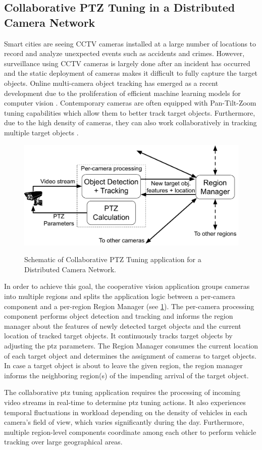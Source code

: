 \subsection{Collaborative PTZ Tuning in a Distributed Camera Network}
Smart cities are seeing CCTV cameras installed at a large number of locations to record and analyze unexpected events such as accidents and crimes. However, surveillance using CCTV cameras is largely done after an incident has occurred and the static deployment of cameras makes it difficult to fully capture the target objects. Online multi-camera object tracking has emerged as a recent development due to the proliferation of efficient machine learning models for computer vision \cite{coralpie}. Contemporary cameras are often equipped with Pan-Tilt-Zoom tuning capabilities which allow them to better track target objects. Furthermore, due to the high density of cameras, they can also work collaboratively in tracking multiple target objects \cite{matsuyama2002real}.
\begin{figure}[h]
\centering
\includegraphics[width=0.75\columnwidth]{figures/apps/multi_cam_ptz}
\label{fig:multi_cam_ptz_app}
\caption{Schematic of Collaborative PTZ Tuning application for a Distributed Camera Network.}
\end{figure}
\par In order to achieve this goal, the cooperative vision application groups cameras into multiple regions and splits the application logic between a per-camera component and a per-region Region Manager (see \cref{fig:multi_cam_ptz_app}). The per-camera processing component performs object detection and tracking and informs the region manager about the features of newly detected target objects and the current location of tracked target objects. It continuously tracks target objects by adjusting the \gls{ptz} parameters. The Region Manager consumes the current location of each target object and determines the assignment of cameras to target objects. In case a target object is about to leave the given region, the region manager informs the neighboring region(s) of the impending arrival of the target object.
\par The collaborative \gls{ptz} tuning application requires the processing of incoming video streams in real-time to determine \gls{ptz} tuning actions. It also experiences temporal fluctuations in workload depending on the density of vehicles in each camera's field of view, which varies significantly during the day. Furthermore, multiple region-level components coordinate among each other to perform vehicle tracking over large geographical areas.

